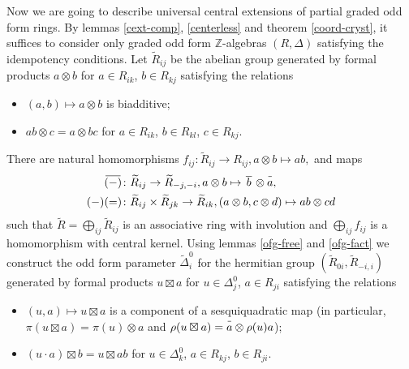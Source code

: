 \documentclass{article}
\theoremstyle{definition}
\newcommand{\inv}[1]{
    \!\;\overline{
        \!\!\:#1\vphantom !\!\!\:
    }\;\!
}
\begin{document}
Now we are going to describe universal central extensions of partial graded odd form rings. By lemmas \ref{cext-comp}, \ref{centerless} and theorem \ref{coord-cryst}, it suffices to consider only graded odd form \(\mathbb Z\)-algebras \((R, \Delta)\) satisfying the idempotency conditions. Let \(\widetilde R_{ij}\) be the abelian group generated by formal products \(a \otimes b\) for \(a \in R_{ik}\), \(b \in R_{kj}\) satisfying the relations
\begin{itemize}

    \item \((a, b) \mapsto a \otimes b\) is biadditive;

    \item \(ab \otimes c = a \otimes bc\) for \(a \in R_{ik}\), \(b \in R_{kl}\), \(c \in R_{kj}\).

\end{itemize}
There are natural homomorphisms \(
    f_{ij} \colon \widetilde R_{ij} \to R_{ij},
    a \otimes b \mapsto ab,
\) and maps
\begin{align*}
    \inv{ (-) }
    &\colon \widetilde R_{ij}
    \to \widetilde R_{-j, -i},
    a \otimes b \mapsto \inv{\,b\,} \otimes \inv a,
    \\
    ({-}) ({=})
    &\colon \widetilde R_{ij} \times \widetilde R_{jk}
    \to \widetilde R_{ik},
    (a \otimes b, c \otimes d)
    \mapsto ab \otimes cd
\end{align*}
such that \(
    \widetilde R = \bigoplus_{ij} \widetilde R_{ij}
\) is an associative ring with involution and \(
    \bigoplus_{ij} f_{ij}
\) is a homomorphism with central kernel. Using lemmas \ref{ofg-free} and \ref{ofg-fact} we construct the odd form parameter \(\widetilde \Delta^0_i\) for the hermitian group \(
    (\widetilde R_{0i}, \widetilde R_{-i, i})
\) generated by formal products \(u \boxtimes a\) for \(u \in \Delta^0_j\), \(a \in R_{ji}\) satisfying the relations
\begin{itemize}

    \item \(
        (u, a) \mapsto u \boxtimes a
    \) is a component of a sesquiquadratic map (in particular, \(
        \pi(u \boxtimes a) = \pi(u) \otimes a
    \) and \(
        \rho(u \boxtimes a) = \inv a \otimes \rho(u) a
    \));

    \item \(
        (u \cdot a) \boxtimes b = u \boxtimes ab
    \) for \(u \in \Delta^0_k\), \(a \in R_{kj}\), \(b \in R_{ji}\).

\end{itemize}
\end{document}
